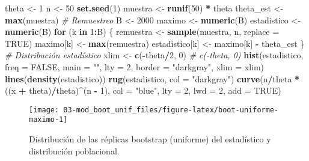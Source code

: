 \documentclass[]{book}
\newenvironment{Shaded}{\begin{snugshade}}{\end{snugshade}}
\newcommand{\KeywordTok}[1]{\textcolor[rgb]{0.13,0.29,0.53}{\textbf{#1}}}
\newcommand{\DataTypeTok}[1]{\textcolor[rgb]{0.13,0.29,0.53}{#1}}
\newcommand{\DecValTok}[1]{\textcolor[rgb]{0.00,0.00,0.81}{#1}}
\newcommand{\StringTok}[1]{\textcolor[rgb]{0.31,0.60,0.02}{#1}}
\newcommand{\CommentTok}[1]{\textcolor[rgb]{0.56,0.35,0.01}{\textit{#1}}}
\newcommand{\OtherTok}[1]{\textcolor[rgb]{0.56,0.35,0.01}{#1}}
\newcommand{\ControlFlowTok}[1]{\textcolor[rgb]{0.13,0.29,0.53}{\textbf{#1}}}
\newcommand{\OperatorTok}[1]{\textcolor[rgb]{0.81,0.36,0.00}{\textbf{#1}}}
\newcommand{\NormalTok}[1]{#1}
\theoremstyle{break}
\theoremstyle{definition}
\theoremstyle{definition}
\theoremstyle{definition}
\theoremstyle{remark}
\begin{document}
\begin{Shaded}
\begin{Highlighting}[]
\NormalTok{theta <-}\StringTok{ }\DecValTok{1}
\NormalTok{n <-}\StringTok{ }\DecValTok{50}
\KeywordTok{set.seed}\NormalTok{(}\DecValTok{1}\NormalTok{)}
\NormalTok{muestra <-}\StringTok{ }\KeywordTok{runif}\NormalTok{(}\DecValTok{50}\NormalTok{) }\OperatorTok{*}\StringTok{ }\NormalTok{theta}
\NormalTok{theta_est <-}\StringTok{ }\KeywordTok{max}\NormalTok{(muestra)}
\CommentTok{# Remuestreo}
\NormalTok{B <-}\StringTok{ }\DecValTok{2000}
\NormalTok{maximo <-}\StringTok{ }\KeywordTok{numeric}\NormalTok{(B)}
\NormalTok{estadistico <-}\StringTok{ }\KeywordTok{numeric}\NormalTok{(B)}
\ControlFlowTok{for}\NormalTok{ (k }\ControlFlowTok{in} \DecValTok{1}\OperatorTok{:}\NormalTok{B) \{}
\NormalTok{    remuestra <-}\StringTok{ }\KeywordTok{sample}\NormalTok{(muestra, n, }\DataTypeTok{replace =} \OtherTok{TRUE}\NormalTok{)}
\NormalTok{    maximo[k] <-}\StringTok{ }\KeywordTok{max}\NormalTok{(remuestra)}
\NormalTok{    estadistico[k] <-}\StringTok{ }\NormalTok{maximo[k] }\OperatorTok{-}\StringTok{ }\NormalTok{theta_est}
\NormalTok{\}}
\CommentTok{# Distribución estadístico}
\NormalTok{xlim <-}\StringTok{ }\KeywordTok{c}\NormalTok{(}\OperatorTok{-}\NormalTok{theta}\OperatorTok{/}\DecValTok{2}\NormalTok{, }\DecValTok{0}\NormalTok{) }\CommentTok{# c(-theta, 0)}
\KeywordTok{hist}\NormalTok{(estadistico, }\DataTypeTok{freq =} \OtherTok{FALSE}\NormalTok{, }\DataTypeTok{main =} \StringTok{""}\NormalTok{, }\DataTypeTok{lty =} \DecValTok{2}\NormalTok{, }
     \DataTypeTok{border =} \StringTok{"darkgray"}\NormalTok{, }\DataTypeTok{xlim =}\NormalTok{ xlim)}
\KeywordTok{lines}\NormalTok{(}\KeywordTok{density}\NormalTok{(estadistico))}
\KeywordTok{rug}\NormalTok{(estadistico, }\DataTypeTok{col =} \StringTok{"darkgray"}\NormalTok{)}
\KeywordTok{curve}\NormalTok{(n}\OperatorTok{/}\NormalTok{theta }\OperatorTok{*}\StringTok{ }\NormalTok{((x }\OperatorTok{+}\StringTok{ }\NormalTok{theta)}\OperatorTok{/}\NormalTok{theta)}\OperatorTok{^}\NormalTok{(n }\OperatorTok{-}\StringTok{ }\DecValTok{1}\NormalTok{), }\DataTypeTok{col =} \StringTok{"blue"}\NormalTok{, }\DataTypeTok{lty =} \DecValTok{2}\NormalTok{, }\DataTypeTok{lwd =} \DecValTok{2}\NormalTok{, }\DataTypeTok{add =} \OtherTok{TRUE}\NormalTok{)}
\end{Highlighting}
\end{Shaded}

\begin{figure}[!htb]

{\centering \texttt{[image: 03-mod\_boot\_unif\_files/figure-latex/boot-uniforme-maximo-1]} 

}

\caption{Distribución de las réplicas bootstrap (uniforme) del estadístico y distribución poblacional.}\label{fig:boot-uniforme-maximo}
\end{figure}
\end{document}
